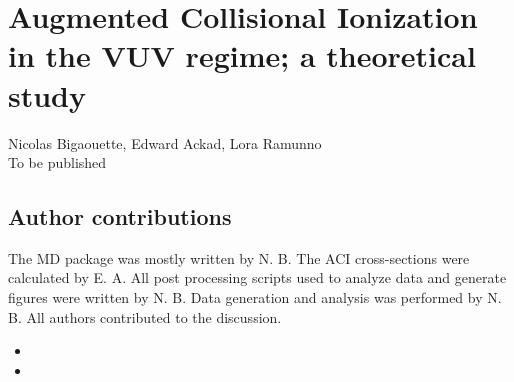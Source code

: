 
\newcommand{\PaperTitleHundrednm}{Augmented Collisional Ionization in the VUV regime; a theoretical study}

\section{\PaperTitleHundrednm}
\label{section:papers:100nm}

\begin{flushright}
Nicolas Bigaouette, Edward Ackad, Lora Ramunno\\
To be published
\end{flushright}

\HidePDFAbstractNumber

\subsection{Author contributions}
The MD package was mostly written by N. B. The ACI cross-sections were calculated
by E. A. All post processing scripts used to analyze data and generate figures
were written by N. B. Data generation and analysis was performed by N. B.
All authors contributed to the discussion.

\begin{itemize}
\item {}
\item {}
\end{itemize}



